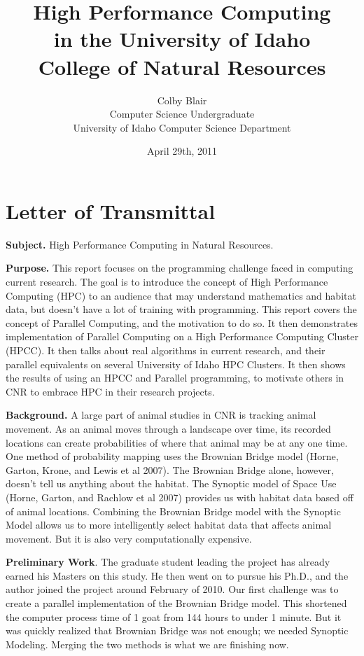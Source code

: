 \documentclass[11pt,letterpaper]{article}
\date{April 29th, 2011}
\title{High Performance Computing \\
	in the University of Idaho \\
	College of Natural Resources}
\author{Colby Blair \\
	Computer Science Undergraduate \\
	University of Idaho Computer Science Department
}
\begin{document}
\section*{Letter of Transmittal}
\textbf{Subject.} High Performance Computing in Natural Resources.

\textbf{Purpose.} This report focuses on the programming challenge faced in computing current research. The goal is to introduce the concept of High Performance Computing (HPC) to an audience that may understand mathematics and habitat data, but doesn't have a lot of training with programming. This report covers the concept of Parallel Computing, and the motivation to do so. It then demonstrates implementation of Parallel Computing on a High Performance Computing Cluster (HPCC). It then talks about real algorithms in current research, and their parallel equivalents on several University of Idaho HPC Clusters. It then shows the results  of using an HPCC and Parallel programming, to motivate others in CNR to embrace HPC in their research projects.

\textbf{Background.} A large part of animal studies in CNR is tracking animal movement. As an animal moves through a landscape over time, its recorded locations can create probabilities of where that animal may be at any one time. One method of probability mapping uses the Brownian Bridge model (Horne, Garton, Krone, and Lewis et al 2007). The Brownian Bridge alone, however, doesn't tell us anything about the habitat. The Synoptic model of Space Use (Horne, Garton, and Rachlow et al 2007) provides us with habitat data based off of animal locations. Combining the Brownian Bridge model with the Synoptic Model allows us to more intelligently select habitat data that affects animal movement. But it is also very computationally expensive.

\textbf{Preliminary Work}. The graduate student leading the project has already earned his Masters on this study. He then went on to pursue his Ph.D., and the author joined the project around February of 2010. Our first challenge was to create a parallel implementation of the Brownian Bridge model. This shortened the computer process time of 1 goat from 144 hours to under 1 minute. But it was quickly realized that Brownian Bridge was not enough; we needed Synoptic Modeling. Merging the two methods is what we are finishing now.

\thispagestyle{empty}

\pagebreak

\maketitle
\end{document}
